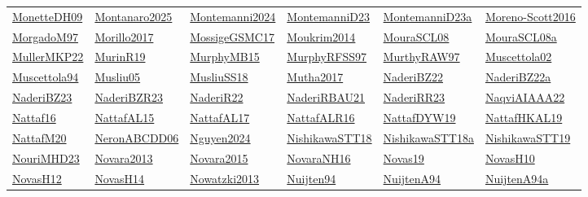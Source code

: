 \begin{longtable}{*{6}{l}}
\hyperref[detail:MonetteDH09]{MonetteDH09} & \hyperref[detail:Montanaro2025]{Montanaro2025} & \hyperref[detail:Montemanni2024]{Montemanni2024} & \hyperref[detail:MontemanniD23]{MontemanniD23} & \hyperref[detail:MontemanniD23a]{MontemanniD23a} & \hyperref[detail:Moreno-Scott2016]{Moreno-Scott2016}\\ 
\hyperref[detail:MorgadoM97]{MorgadoM97} & \hyperref[detail:Morillo2017]{Morillo2017} & \hyperref[detail:MossigeGSMC17]{MossigeGSMC17} & \hyperref[detail:Moukrim2014]{Moukrim2014} & \hyperref[detail:MouraSCL08]{MouraSCL08} & \hyperref[detail:MouraSCL08a]{MouraSCL08a}\\ 
\hyperref[detail:MullerMKP22]{MullerMKP22} & \hyperref[detail:MurinR19]{MurinR19} & \hyperref[detail:MurphyMB15]{MurphyMB15} & \hyperref[detail:MurphyRFSS97]{MurphyRFSS97} & \hyperref[detail:MurthyRAW97]{MurthyRAW97} & \hyperref[detail:Muscettola02]{Muscettola02}\\ 
\hyperref[detail:Muscettola94]{Muscettola94} & \hyperref[detail:Musliu05]{Musliu05} & \hyperref[detail:MusliuSS18]{MusliuSS18} & \hyperref[detail:Mutha2017]{Mutha2017} & \hyperref[detail:NaderiBZ22]{NaderiBZ22} & \hyperref[detail:NaderiBZ22a]{NaderiBZ22a}\\ 
\hyperref[detail:NaderiBZ23]{NaderiBZ23} & \hyperref[detail:NaderiBZR23]{NaderiBZR23} & \hyperref[detail:NaderiR22]{NaderiR22} & \hyperref[detail:NaderiRBAU21]{NaderiRBAU21} & \hyperref[detail:NaderiRR23]{NaderiRR23} & \hyperref[detail:NaqviAIAAA22]{NaqviAIAAA22}\\ 
\hyperref[detail:Nattaf16]{Nattaf16} & \hyperref[detail:NattafAL15]{NattafAL15} & \hyperref[detail:NattafAL17]{NattafAL17} & \hyperref[detail:NattafALR16]{NattafALR16} & \hyperref[detail:NattafDYW19]{NattafDYW19} & \hyperref[detail:NattafHKAL19]{NattafHKAL19}\\ 
\hyperref[detail:NattafM20]{NattafM20} & \hyperref[detail:NeronABCDD06]{NeronABCDD06} & \hyperref[detail:Nguyen2024]{Nguyen2024} & \hyperref[detail:NishikawaSTT18]{NishikawaSTT18} & \hyperref[detail:NishikawaSTT18a]{NishikawaSTT18a} & \hyperref[detail:NishikawaSTT19]{NishikawaSTT19}\\ 
\hyperref[detail:NouriMHD23]{NouriMHD23} & \hyperref[detail:Novara2013]{Novara2013} & \hyperref[detail:Novara2015]{Novara2015} & \hyperref[detail:NovaraNH16]{NovaraNH16} & \hyperref[detail:Novas19]{Novas19} & \hyperref[detail:NovasH10]{NovasH10}\\ 
\hyperref[detail:NovasH12]{NovasH12} & \hyperref[detail:NovasH14]{NovasH14} & \hyperref[detail:Nowatzki2013]{Nowatzki2013} & \hyperref[detail:Nuijten94]{Nuijten94} & \hyperref[detail:NuijtenA94]{NuijtenA94} & \hyperref[detail:NuijtenA94a]{NuijtenA94a}\\ 

\end{longtable}
